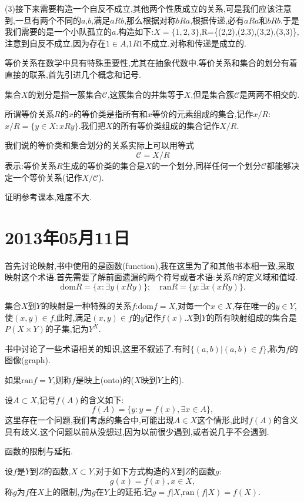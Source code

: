 \documentclass[12pt,a4paper,openany]{book}
\begin{document}
(3)接下来需要构造一个自反不成立,其他两个性质成立的关系,可是我们应该注意到,一旦有两个不同的$a$,$b$,满足$aRb$,那么根据对称$bRa$,根据传递,必有$aRa$和$bRb$.于是我们需要的是一个小队孤立的$a$.构造如下:$X=\{1,2,3\}$,R=\{(2,2),(2,3),(3,2),(3,3)\},注意到自反不成立,因为存在$1\in A$,$1R1$不成立.对称和传递是成立的.

等价关系在数学中具有特殊重要性,尤其在抽象代数中.等价关系和集合的划分有着直接的联系,首先引进几个概念和记号.

集合$X$的划分是指一簇集合$\mathscr{C}$,这簇集合的并集等于$X$,但是集合簇$\mathscr{C}$是两两不相交的.

所谓等价关系$R$的$x$的等价类是指所有和$x$等价的元素组成的集合,记作$x/R$:$x/R=\{y \in X:xRy\}$.我们把$X$的所有等价类组成的集合记作$X/R$.

我们说的等价类和集合划分的关系实际上可以用等式
\[
\mathscr{C} = X/R
\]
表示:等价关系$R$生成的等价类的集合是$X$的一个划分,同样任何一个划分$\mathscr{C}$都能够决定一个等价关系(记作$X/\mathscr{C}$).

证明参考课本,难度不大.

\section{2013年05月11日}
首先讨论映射,书中使用的是函数(function),我在这里为了和其他书本相一致,采取映射这个术语.首先需要了解前面遗漏的两个符号或者术语:关系$R$的定义域和值域.
\[
\text{dom}{R}=\{x: \exists y (xRy)\};\quad \text{ran}{R}=\{y: \exists x(xRy)\}.
\]

集合$X$到$Y$的映射是一种特殊的关系$f$:$\text{dom}{f}=X$,对每一个$x \in X$,存在唯一的$y \in Y$,使$(x,y) \in f$,此时,满足$(x,y) \in f$的$y$记作$f(x)$.$X$到$Y$的所有映射组成的集合是$P(X \times Y)$的子集,记为$Y^X$.

书中讨论了一些术语相关的知识,这里不叙述了.有时$\{(a,b)|(a,b) \in f\}$,称为$f$的图像(graph).

如果$\text{ran}{f}=Y$,则称$f$是映上(onto)的($X$映到$Y$上的).

设$A \subset X$,记号$f(A)$的含义如下:
\[
f(A)=\{y : y=f(x), \exists x \in A\},
\]
这里存在一个问题,我们考虑的集合中,可能出现$A \in X$这个情形,此时$f(A)$的含义具有歧义.这个问题以前从没想过,因为以前很少遇到,或者说几乎不会遇到.

函数的限制与延拓.

设$f$是$Y$到$Z$的函数,$X \subset Y$,对于如下方式构造的$X$到$Z$的函数$g$:
\[
g(x)=f(x),x \in X,
\]
称$g$为$f$在$X$上的限制,$f$为$g$在$Y$上的延拓.记$g=f|X$,$\text{ran}{(f|X)}=f(X)$.
\end{document}
